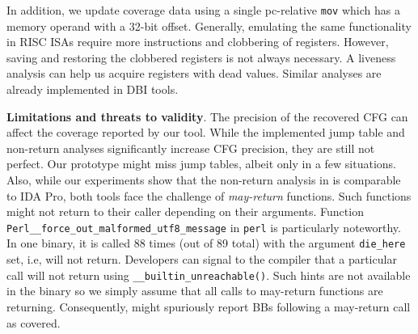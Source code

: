 In addition, we update coverage data using a single pc-relative \texttt{mov} which has a memory operand with a 32-bit offset.
Generally, emulating the same functionality in RISC ISAs require more instructions and clobbering of registers.
However, saving and restoring the clobbered registers is not always necessary.
A liveness analysis can help us acquire registers with dead values. 
Similar analyses are already implemented in DBI tools.


\textbf{Limitations and threats to validity}.
The precision of the recovered CFG can affect the coverage reported by our tool.
While the implemented jump table and non-return analyses significantly increase CFG precision, 
they are still not perfect.
Our prototype might miss jump tables, albeit only in a few situations.
Also, while our experiments show that the non-return analysis in {\bcov} is comparable to IDA Pro, both tools face the challenge of \textit{may-return} functions.
Such functions might not return to their caller depending on their arguments.
Function \texttt{Perl\_\_force\_out\_malformed\_utf8\_message} in \texttt{perl} is particularly noteworthy.
In one binary, it is called 88 times (out of 89 total) with the argument \texttt{die\_here} set, i.e, will not return.
Developers can signal to the compiler that a particular call will not return using  \texttt{\_\_builtin\_unreachable()}.
Such hints are not available in the binary so we simply assume that all calls to may-return functions are returning.
Consequently, {\bcov} might spuriously report BBs following a may-return call as covered.


